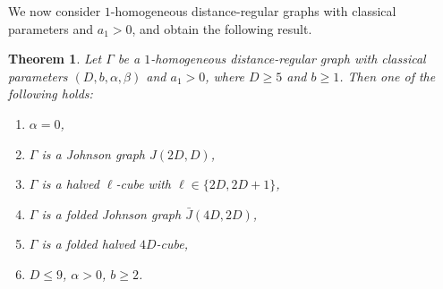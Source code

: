 \documentclass[11pt]{article}
\newtheorem{theorem}[theo]{Theorem}
\theoremstyle{definition}
\numberwithin{equation}{section}
\numberwithin{equation}{section}
\begin{document}
We now consider $1$-homogeneous distance-regular graphs with classical parameters and $a_1 > 0$, and obtain the following result.

\begin{theorem}\label{classical}
Let $\Gamma$ be a $1$-homogeneous distance-regular graph with classical parameters $(D,b,\alpha, \beta)$ and $a_1>0$, where $D \geqslant 5$ and $b \geqslant 1$. Then one of the following holds:
\begin{enumerate}[\normalfont(i)]
  \item $\alpha=0$,
  \item $\Gamma$ is a Johnson graph $J(2D,D)$,
  \item $\Gamma$ is a halved $\ell$-cube with $\ell \in \{2D,2D+1\}$,
  \item $\Gamma$ is a folded Johnson graph $\bar{J}(4D,2D)$,
  \item $\Gamma$ is a folded halved $4D$-cube,
  \item $D \leqslant 9$, $\alpha>0$, $b\geqslant2$.
\end{enumerate}
\end{theorem}
\end{document}
